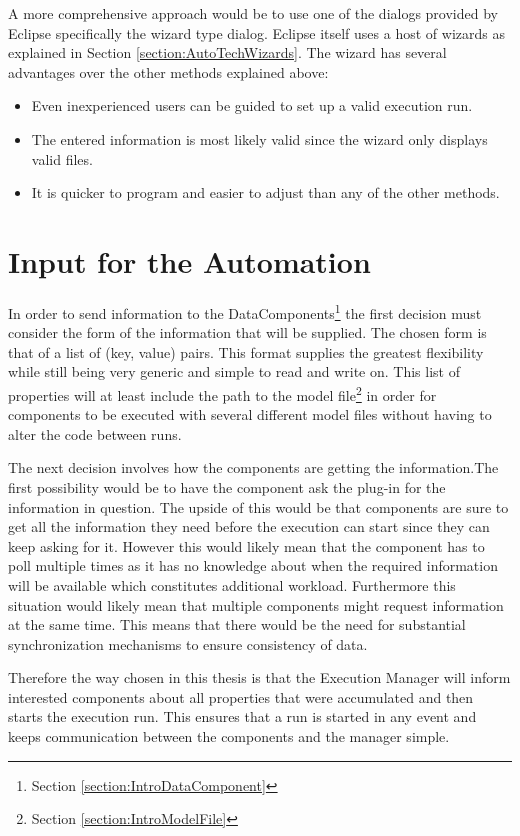 A more comprehensive approach would be to use one of the dialogs provided by Eclipse specifically the wizard type dialog.
Eclipse itself uses a host of wizards as explained in Section \ref{section:AutoTechWizards}.
The wizard has several advantages over the other methods explained above:
\begin{itemize}
 \item Even inexperienced users can be guided to set up a valid execution run.
 \item The entered information is most likely valid since the wizard only displays valid files.
 \item It is quicker to program and easier to adjust than any of the other methods.
\end{itemize}


\section{Input for the Automation}
\label{section:AutoConceptsInput}
In order to send information to the DataComponents\footnote{Section \ref{section:IntroDataComponent}}
the first decision must consider the form of the information that will be supplied.
The chosen form is that of a list of (key, value) pairs. This format supplies the greatest
flexibility while still being very generic and simple to read and write on.
This list of properties will at least include the path to the model file\footnote{Section \ref{section:IntroModelFile}} in order
for components to be executed with several different model files without having
to alter the code between runs.

The next decision involves how the components are getting the information.The first possibility 
would be to have the component ask the plug-in for the information
in question. The upside of this would be that components are sure to get all the information
they need before the execution can start since they can keep asking for it. However this would
likely mean that the component has to poll multiple times as it has no knowledge about when
the required information will be available which constitutes additional workload. Furthermore
this situation would likely mean that multiple components might request information
at the same time. This means that there would be the need for substantial synchronization mechanisms
to ensure consistency of data.

Therefore the way chosen in this thesis is that the Execution Manager will inform interested components
about all properties that were accumulated and then starts the execution run. This ensures
that a run is started in any event and keeps communication between the components and the manager simple.

